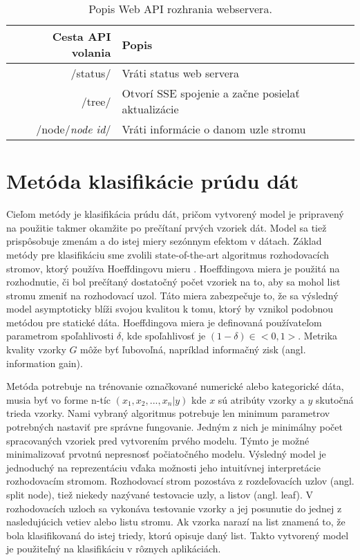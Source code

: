 \begin{table}[!htp]
\centering
\begin{tabular}{|r|l|}
\hline
\textbf{Cesta API volania} & \textbf{Popis} \\ \hline
/status/ & Vráti status web servera \\ \hline
/tree/ & Otvorí SSE spojenie a začne posielať aktualizácie \\ \hline
/node/\textit{node id}/ & Vráti informácie o danom uzle stromu \\ \hline
\end{tabular}
\caption{Popis Web API rozhrania webservera.}
\label{tab-web-api}
\end{table}

\section{Metóda klasifikácie prúdu dát}
\label{method-klasifikacia-prudu-dat}
Cieľom metódy je klasifikácia prúdu dát, pričom vytvorený model je pripravený na použitie takmer okamžite po prečítaní prvých vzoriek dát. Model sa tiež prispôsobuje zmenám a do istej miery sezónnym efektom v dátach. Základ metódy pre klasifikáciu sme zvolili state-of-the-art algoritmus rozhodovacích stromov, ktorý používa Hoeffdingovu mieru \citep{domingos2000mining, gaber2005mining, krempl2014open}. Hoeffdingova miera je použitá na rozhodnutie, či bol prečítaný dostatočný počet vzoriek na to, aby sa mohol list stromu zmeniť na rozhodovací uzol. Táto miera zabezpečuje to, že sa výsledný model asymptoticky blíži svojou kvalitou k tomu, ktorý by vznikol podobnou metódou pre statické dáta. Hoeffdingova miera je definovaná používateľom parametrom spoľahlivosti $\delta$, kde spoľahlivosť je $(1-\delta) \in <0,1>$. Metrika kvality vzorky $G$ môže byť ľubovoľná, napríklad informačný zisk (angl. information gain).
\par
Metóda potrebuje na trénovanie označkované numerické alebo kategorické dáta, musia byť vo forme n-tíc $(x_1, x_2, ..., x_n | y)$ kde $x$ sú atribúty vzorky a $y$ skutočná trieda vzorky. Nami vybraný algoritmus potrebuje len minimum parametrov potrebných nastaviť pre správne fungovanie. Jedným z nich je minimálny počet spracovaných vzoriek pred vytvorením prvého modelu. Týmto je možné minimalizovať prvotnú nepresnosť počiatočného modelu. Výsledný model je jednoduchý na reprezentáciu vďaka možnosti jeho intuitívnej interpretácie rozhodovacím stromom. Rozhodovací strom pozostáva z rozdeľovacích uzlov (angl. split node), tiež niekedy nazývané testovacie uzly, a listov (angl. leaf). V rozhodovacích uzloch sa vykonáva testovanie vzorky a jej posunutie do jednej z nasledujúcich vetiev alebo listu stromu. Ak vzorka narazí na list znamená to, že bola klasifikovaná do istej triedy, ktorú opisuje daný list. Takto vytvorený model je použiteľný na klasifikáciu v rôznych aplikáciách.
